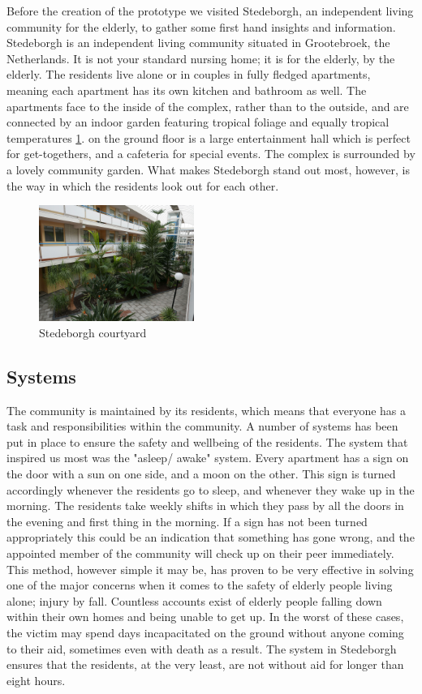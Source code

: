 \documentclass{below-ext}
\begin{document}
Before the creation of the prototype we visited Stedeborgh, an independent living community for the elderly, to gather some first hand insights and information. Stedeborgh is an independent living community situated in Grootebroek, the Netherlands.  It is not your standard nursing home; it is for the elderly, by the elderly. The residents live alone or in couples in fully fledged apartments, meaning each apartment has its own kitchen and bathroom as well. The apartments face to the inside of the complex, rather than to the outside, and are connected by an indoor garden featuring tropical foliage and equally tropical temperatures \ref{fig:stedeborgh}. on the ground floor is a large entertainment hall which is perfect for get-togethers, and a cafeteria for special events. The complex is surrounded by a lovely community garden. What makes Stedeborgh stand out most, however, is the way in which the residents look out for each other.\\
\vspace{0.2cm}
\begin{figure}
\centering
\includegraphics[width=0.45\textwidth]{stedeborgh}
\caption{Stedeborgh courtyard}
\label{fig:stedeborgh}
\end{figure}

\subsection{Systems}
The community is maintained by its residents, which means that everyone has a task and responsibilities within the community. A number of systems has been put in place to ensure the safety and wellbeing of the residents. The system that inspired us most was the "asleep/ awake" system. Every apartment has a sign on the door with a sun on one side, and a moon on the other. This sign is turned accordingly whenever the residents go to sleep, and whenever they wake up in the morning. The residents take weekly shifts in which they pass by all the doors in the evening and first thing in the morning. If a sign has not been turned appropriately this could be an indication that something has gone wrong, and the appointed member of the community will check up on their peer immediately. This method, however simple it may be, has proven to be very effective in solving one of the major concerns when it comes to the safety of elderly people living alone; injury by fall. Countless accounts exist of elderly people falling down within their own homes and being unable to get up. In the worst of these cases, the victim may spend days incapacitated on the ground without anyone coming to their aid, sometimes even with death as a result. The system in Stedeborgh ensures that the residents, at the very least, are not without aid for longer than eight hours. 
\end{document}
